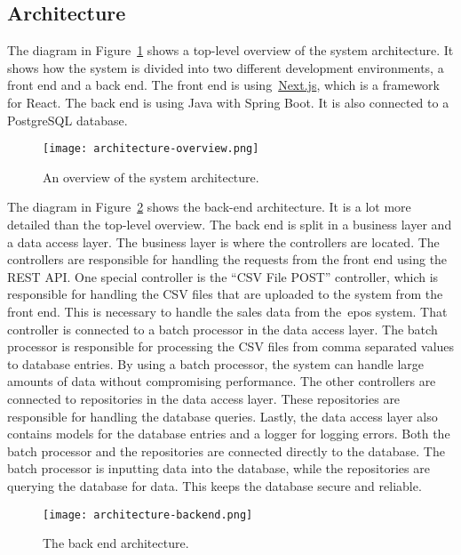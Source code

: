 \subsection{Architecture}\label{subsec:architecture}

The diagram in Figure~\ref{fig:architecture-overview} shows a top-level overview of the system architecture.
It shows how the system is divided into two different development environments, a front end and a back end.
The front end is using~\url{Next.js}, which is a framework for React.
The back end is using Java with Spring Boot.
It is also connected to a PostgreSQL database.

\begin{figure}[H]
    \centering
    \texttt{[image: architecture-overview.png]}
    \caption{An overview of the system architecture.
    }\label{fig:architecture-overview}
\end{figure}

The diagram in Figure~\ref{fig:architecture-backend} shows the back-end architecture.
It is a lot more detailed than the top-level overview.
The back end is split in a business layer and a data access layer.
The business layer is where the controllers are located.
The controllers are responsible for handling the requests from the front end using the REST API.\@
One special controller is the ``CSV File POST'' controller, which is responsible for handling the CSV files that
are uploaded to the system from the front end.
This is necessary to handle the sales data from the~\acrshort{epos} system.
That controller is connected to a batch processor in the data access layer.
The batch processor is responsible for processing the CSV files from comma separated values to database entries.
By using a batch processor, the system can handle large amounts of data without compromising performance.
The other controllers are connected to repositories in the data access layer.
These repositories are responsible for handling the database queries.
Lastly, the data access layer also contains models for the database entries and a logger for logging errors.
Both the batch processor and the repositories are connected directly to the database.
The batch processor is inputting data into the database, while the repositories are querying the database for data.
This keeps the database secure and reliable.

\begin{figure}[H]
    \centering
    \texttt{[image: architecture-backend.png]}
    \caption{The back end architecture.
    }\label{fig:architecture-backend}
\end{figure}
